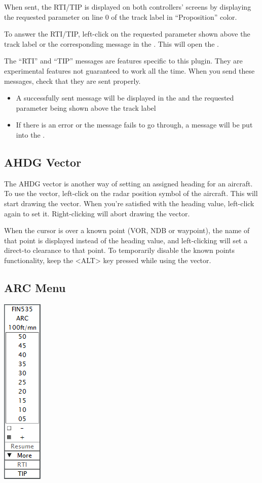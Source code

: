 \documentclass[11pt,a4paper]{memoir}
\newenvironment{Warn}
  {\begin{shaded}\marginnote{\fbox{Warning}}}
  {\end{shaded}}
\begin{document}
When sent, the RTI/TIP is displayed on both controllers’ screens by displaying the requested parameter on line 0 of the track label in “Proposition” color.

To answer the RTI/TIP, left-click on the requested parameter shown above the track label or the corresponding message in the \textit{}. This will open the \textit{}.

\begin{Warn}
The “RTI” and “TIP” messages are features specific to this plugin. They are experimental features not guaranteed to work all the time. When you send these messages, check that they are sent properly.

\begin{itemize}
        \item A successfully sent message will be displayed in the \textit{} and the requested parameter being shown above the track label
        \item If there is an error or the message fails to go through, a message will be put into the \textit{}.
\end{itemize}
\end{Warn}

\subsection{AHDG Vector}
\label{menu:ahdgv}
The AHDG vector is another way of setting an assigned heading for an aircraft. To use the vector, left-click on the radar position symbol of the aircraft. This will start drawing the vector. When you’re satisfied with the heading value, left-click again to set it. Right-clicking will abort drawing the vector.

When the cursor is over a known point (VOR, NDB or waypoint), the name of that point is displayed instead of the heading value, and left-clicking will set a direct-to clearance to that point. To temporarily disable the known points functionality, keep the <ALT> key pressed while using the vector.

\subsection{ARC Menu}
\label{menu:arc}
\includegraphics{img/arc.png}
\end{document}
